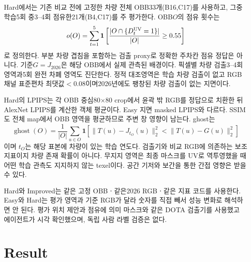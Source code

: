 \documentclass[11pt,a4paper]{article}
\newcommand{\ind}{\mathbf{1}}
\begin{document}
Hard에서는 기존 비교 전에 고정한 차량 전체 OBB33개(B16,C17)를 사용하고, 그중 학습5회 중3--4회 점유한21개(B4,C17)를 주 평가한다. OBB$O$의 점유 횟수는
\begin{equation}
 o(O)=\sum_{t=1}^5\ind\left[\frac{|O\cap\{D_t^{\rm UV}=1\}|}{|O|}\ge0.55\right]
\end{equation}
로 정의한다. 부분 차량 겹침을 포함하는 검출 proxy로 정확한 주차칸 점유 정답은 아니다. 기준$G=J_{2026}$은 해당 OBB에서 실제 관측된 배경이다. 픽셀별 차량 검출3--4회 영역과5회 완전 차폐 영역도 진단한다. 정적 대조영역은 학습 차량 검출이 없고 RGB 채널 표준편차 최댓값$<0.08$이며2026년에도 팽창된 차량 검출이 없는 지면이다.

Hard의 LPIPS는 각 OBB 중심80$\times$80 crop에서 윤곽 밖 RGB를 정답으로 치환한 뒤 AlexNet LPIPS를 계산한 객체 평균이다. Easy 지면 masked LPIPS와 다르다. SSIM도 전체 map에서 OBB 영역을 평균하므로 주변 창 영향이 남는다. ghost는
\begin{equation}
 \operatorname{ghost}(O)=\frac1{|O|}\sum_{u\in O}\ind\left[
 \|T(u)-J_{t_O}(u)\|_2^2<\|T(u)-G(u)\|_2^2\right]
\end{equation}
이며 $t_O$는 해당 표본에 차량이 있는 학습 연도다. 검출기와 비교 RGB에 의존하는 보조 지표이지 차량 존재 확률이 아니다. 무지지 영역은 최종 마스크를 UV로 역투영했을 때 어떤 학습 관측도 지지하지 않는 texel이다. 공간 기저와 보간을 통한 간접 영향은 받을 수 있다.

Hard와 Improved는 같은 고정 OBBㆍ같은2026 RGBㆍ같은 지표 코드를 사용한다. Easy와 Hard는 평가 영역과 기준 RGB가 달라 숫자를 직접 빼서 성능 변화로 해석하면 안 된다. 평가 위치 제안과 점유에 의미 마스크와 같은 DOTA 검출기를 사용했고 에이전트가 시각 확인했으며, 독립 사람 라벨 검증은 없다.

\clearpage
\section{Result}
\end{document}
